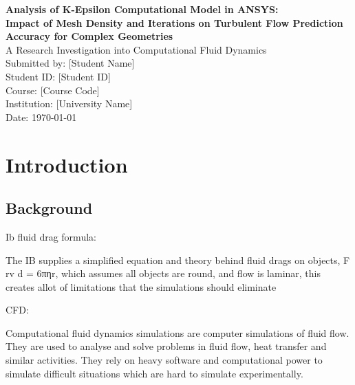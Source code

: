 \documentclass[12pt,a4paper]{article}
\begin{document}
\begin{titlepage}
\centering
\vspace*{2cm}
{\LARGE\bfseries Analysis of K-Epsilon Computational Model in ANSYS:\\[0.5cm] 
Impact of Mesh Density and Iterations on Turbulent Flow Prediction Accuracy for Complex Geometries}\\[2cm]

{\large A Research Investigation into Computational Fluid Dynamics}\\[1.5cm]

{\large Submitted by: [Student Name]}\\[0.5cm]
{\large Student ID: [Student ID]}\\[0.5cm]
{\large Course: [Course Code]}\\[0.5cm]
{\large Institution: [University Name]}\\[1.5cm]

{\large Date: \today}\\[2cm]

\vfill
\end{titlepage}

\newpage
\tableofcontents
\newpage

\listoffigures
\newpage

\listoftables
\newpage

\section{Introduction}

\subsection{Background}

Ib fluid drag formula:

The IB supplies a simplified equation and theory behind fluid drags on objects, F rv d = 6πηr, which assumes all objects are round, and flow is laminar, this creates allot of limitations that the simulations should eliminate

CFD: 

Computational fluid dynamics simulations are computer simulations of fluid flow. They are used to analyse and solve problems in fluid flow, heat transfer and similar activities. They rely on heavy software and computational power to simulate difficult situations which are hard to simulate experimentally. 
\end{document}
